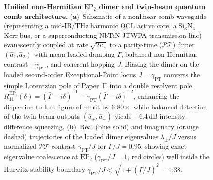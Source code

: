\documentclass[11pt,letterpaper]{article}
\theoremstyle{definition}
\theoremstyle{remark}
\begin{document}
\begin{figure}[t!]
\centering
\resizebox{0.98\textwidth}{!}{}
\caption{\textbf{Unified non-Hermitian $\mathrm{EP}_2$ dimer and twin-beam quantum comb architecture.} (\textbf{a})~Schematic of a nonlinear comb waveguide (representing a mid-IR/THz harmonic QCL active core, a $\mathrm{Si_3N_4}$ Kerr bus, or a superconducting $\mathrm{NbTiN}$ JTWPA transmission line) evanescently coupled at rate $\sqrt{2\kappa_e}$ to a parity-time ($\mathcal{PT}$) dimer $(\hat{a}_1, \hat{a}_2)$ with mean loaded damping $\bar{\Gamma}$, balanced non-Hermitian contrast $\pm\gamma_{\mathrm{PT}}$, and coherent hopping $J$. Biasing the dimer on the loaded second-order Exceptional-Point locus $J = \gamma_{\mathrm{PT}}$ converts the simple Lorentzian pole of Paper~II into a double resolvent pole $R_{11}^{\mathrm{EP}_2}(\delta) = (\bar{\Gamma} - i\delta)^{-1} - \gamma_{\mathrm{PT}}(\bar{\Gamma} - i\delta)^{-2}$, enhancing the dispersion-to-loss figure of merit by $6.80\times$ while balanced detection of the twin-beam outputs $(\hat{a}_+, \hat{a}_-)$ yields $-6.4\,\mathrm{dB}$ intensity-difference squeezing. (\textbf{b})~Real (blue solid) and imaginary (orange dashed) trajectories of the loaded dimer eigenvalues $\lambda_\pm/J$ versus normalized $\mathcal{PT}$ contrast $\gamma_{\mathrm{PT}}/J$ for $\bar{\Gamma}/J = 0.95$, showing exact eigenvalue coalescence at $\mathrm{EP}_2$ ($\gamma_{\mathrm{PT}}/J = 1$, red circles) well inside the Hurwitz stability boundary $\gamma_{\mathrm{PT}}/J < \sqrt{1 + (\bar{\Gamma}/J)^2} = 1.38$.}
\label{fig:ep2_architecture}
\end{figure}
\end{document}
